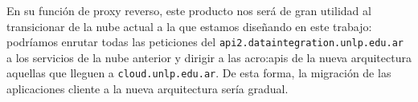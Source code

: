 En su función de proxy reverso, este producto nos será de gran utilidad al transicionar de la nube actual a la que estamos diseñando en este trabajo: podríamos enrutar todas las peticiones del  \texttt{api2.dataintegration.unlp.edu.ar} a los servicios de la nube anterior y dirigir a las \glspl{acro:api} de la nueva arquitectura aquellas que lleguen a \texttt{cloud.unlp.edu.ar}. De esta forma, la migración de las aplicaciones cliente a la nueva arquitectura sería gradual.
